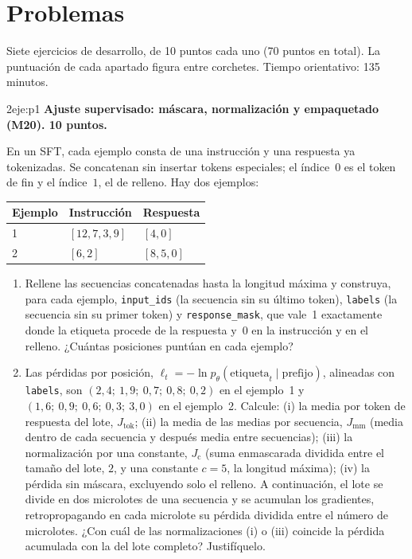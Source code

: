 \chapter{Problemas}
\label{cap:problemas}

Siete ejercicios de desarrollo, de 10 puntos cada uno (70 puntos en total). La puntuación de cada apartado figura entre corchetes. Tiempo orientativo: 135 minutos.

\begin{ejercicio}{2}{eje:p1}
\textbf{Ajuste supervisado: máscara, normalización y empaquetado (M20). 10 puntos.}

En un SFT, cada ejemplo consta de una instrucción y una respuesta ya tokenizadas. Se concatenan sin insertar tokens especiales; el índice~$0$ es el token de fin y el índice~$1$, el de relleno. Hay dos ejemplos:
\begin{center}
\begin{tabular}{@{}lll@{}}
\toprule
Ejemplo & Instrucción & Respuesta \\
\midrule
1 & $[12,7,3,9]$ & $[4,0]$ \\
2 & $[6,2]$ & $[8,5,0]$ \\
\bottomrule
\end{tabular}
\end{center}
\begin{enumerate}[label=(\alph*)]
  \item {} Rellene las secuencias concatenadas hasta la longitud máxima y construya, para cada ejemplo, \texttt{input\_\allowbreak ids} (la secuencia sin su último token), \texttt{labels} (la secuencia sin su primer token) y \texttt{response\_\allowbreak mask}, que vale~1 exactamente donde la etiqueta procede de la respuesta y~0 en la instrucción y en el relleno. ¿Cuántas posiciones puntúan en cada ejemplo?
  \item {} Las pérdidas por posición, $\ell_t=-\ln p_\theta(\text{etiqueta}_t\mid\text{prefijo})$, alineadas con \texttt{labels}, son $(2{,}4;\ 1{,}9;\ 0{,}7;\ 0{,}8;\ 0{,}2)$ en el ejemplo~1 y $(1{,}6;\ 0{,}9;\ 0{,}6;\ 0{,}3;\ 3{,}0)$ en el ejemplo~2. Calcule: (i) la media por token de respuesta del lote, $J_{\mathrm{tok}}$; (ii) la media de las medias por secuencia, $J_{\mathrm{mm}}$ (media dentro de cada secuencia y después media entre secuencias); (iii) la normalización por una constante, $J_{\mathrm{c}}$ (suma enmascarada dividida entre el tamaño del lote, $2$, y una constante $c=5$, la longitud máxima); (iv) la pérdida sin máscara, excluyendo solo el relleno. A continuación, el lote se divide en dos microlotes de una secuencia y se acumulan los gradientes, retropropagando en cada microlote su pérdida dividida entre el número de microlotes. ¿Con cuál de las normalizaciones (i) o (iii) coincide la pérdida acumulada con la del lote completo? Justifíquelo.

\end{enumerate}
\end{ejercicio}
